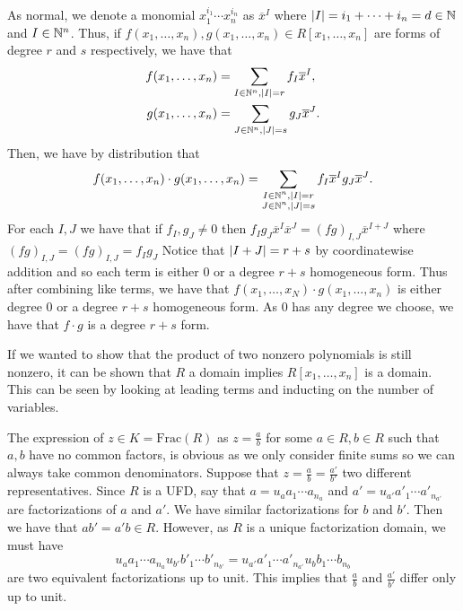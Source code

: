\documentclass[letterpaper, 11pt, oneside]{book}
\begin{document}
\begin{sol}\label{ex:Curves_1.1}
  As normal, we denote a monomial $x_{1}^{i_{1}} \cdots x_{n}^{i_{n}}$ as $\overline{x}^{I}$ where $\abs{I} = i_{1} + \cdots + i_{n} = d \in \mathbb{N}$ and $I \in \mathbb{N}^{n}$.
  Thus, if $f(x_{1}, \ldots, x_{n}), g(x_{1}, \ldots, x_{n}) \in R[x_{1}, \ldots, x_{n}]$ are forms of degree $r$ and $s$ respectively, we have that
  \begin{align*}
    f(x_{1}, \ldots, x_{n}) &= \sum_{I \in \mathbb{N} ^{n}, \abs{I} = r} f_{I} \overline{x}^{I}, \\
    g(x_{1}, \ldots, x_{n}) &= \sum_{J \in \mathbb{N} ^{n}, \abs{J} = s} g_{J} \overline{x}^{J}.
  \end{align*}
  Then, we have by distribution that
  \[
    f(x_{1}, \ldots, x_{n}) \cdot g(x_{1}, \ldots, x_{n}) = \sum_{\substack{I \in \mathbb{N} ^{n}, \abs{I} = r \\ J \in \mathbb{N} ^{n}, \abs{J} = s}} f_{I} \overline{x}^{I} g_{J} \overline{x}^{J}.
  \]
  For each $I, J$ we have that if $f_{I}, g_{J} \neq 0$ then $f_{I} g_{J} \overline{x}^{I} \overline{x}^{J} = (fg)_{I, J} \overline{x}^{I + J}$ where $(fg)_{I, J} = (fg)_{I, J} = f_{I} g_{J}$
  Notice that $\abs{I + J} = r + s$ by coordinatewise addition and so each term is either $0$ or a degree $r + s$ homogeneous form.
  Thus after combining like terms, we have that $f(x_{1}, \ldots, x_{N}) \cdot g(x_{1}, \ldots, x_{n})$ is either degree $0$ or a degree $r + s$ homogeneous form.
  As $0$ has any degree we choose, we have that $f \cdot g$ is a degree $r + s$ form.

  If we wanted to show that the product of two nonzero polynomials is still nonzero, it can be shown that $R$ a domain implies $R[x_{1}, \ldots, x_{n}]$ is a domain.
  This can be seen by looking at leading terms and inducting on the number of variables.
\end{sol}

\clearpage

\begin{sol}\label{ex:Curves_1.2}
  The expression of $z \in K = \mathrm{Frac}(R)$ as $z = \frac{a}{b}$ for some $a \in R, b \in R$ such that $a, b$ have no common factors, is obvious as we only consider finite sums so we can always take common denominators.
  Suppose that $z = \frac{a}{b} = \frac{a'}{b'}$ two different representatives.
  Since $R$ is a UFD, say that $a = u_{a}a_{1} \cdots a_{n_{a}}$ and $a' = u_{a'}a'_{1} \cdots a'_{n_{a'}}$ are factorizations of $a$ and $a'$.
  We have similar factorizations for $b$ and $b'$.
  Then we have that $ab' = a'b \in R$.
  However, as $R$ is a unique factorization domain, we must have
  \[
    u_{a}a_{1} \cdots a_{n_{a}} u_{b'}b'_{1} \cdots b'_{n_{b'}} = u_{a'}a'_{1} \cdots a'_{n_{a'}} u_{b}b_{1} \cdots b_{n_{b}}
  \]
  are two equivalent factorizations up to unit.
  This implies that $\frac{a}{b}$ and $\frac{a'}{b'}$ differ only up to unit.
\end{sol}
\end{document}
